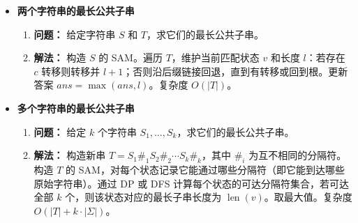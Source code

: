 \begin{itemize}
    \item \textbf{两个字符串的最长公共子串}
    \begin{enumerate}
        \item \textbf{问题：} 给定字符串 $S$ 和 $T$，求它们的最长公共子串。
        \item \textbf{解法：} 构造 $S$ 的 SAM。遍历 $T$，维护当前匹配状态 $v$ 和长度 $l$：若存在 $c$ 转移则转移并 $l+1$；否则沿后缀链接回退，直到有转移或回到根。更新答案 $ans=\max(ans,l)$。复杂度 $O(|T|)$。
    \end{enumerate}

    \item \textbf{多个字符串的最长公共子串}
    \begin{enumerate}
        \item \textbf{问题：} 给定 $k$ 个字符串 $S_1,\dots,S_k$，求它们的最长公共子串。
        \item \textbf{解法：} 构造新串 $T=S_1\#_1 S_2\#_2 \cdots S_k\#_k$，其中 $\#_i$ 为互不相同的分隔符。构造 $T$ 的 SAM，对每个状态记录它能通过哪些分隔符（即它能到达哪些原始字符串）。通过 DP 或 DFS 计算每个状态的可达分隔符集合，若可达全部 $k$ 个，则该状态对应的最长子串长度为 $\operatorname{len}(v)$。取最大值。复杂度 $O(|T| + k\cdot |\Sigma|)$。
    \end{enumerate}
\end{itemize}